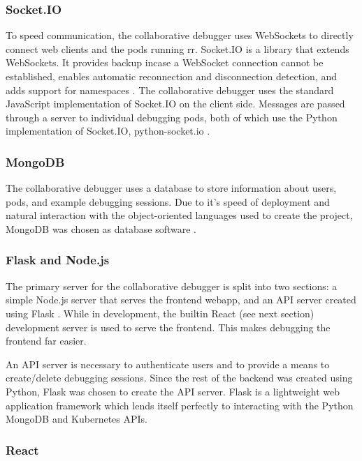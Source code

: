 \documentclass[12pt]{article}
\begin{document}
\subsubsection{Socket.IO}\label{socketio}

To speed communication, the collaborative debugger uses WebSockets to
directly connect web clients and the pods running rr.  Socket.IO is a
library that extends WebSockets.  It provides backup incase a
WebSocket connection cannot be established, enables automatic
reconnection and disconnection detection, and adds support for
namespaces \cite{socketio}.  The collaborative debugger uses the
standard JavaScript implementation of Socket.IO on the client side.
Messages are passed through a server to individual debugging pods,
both of which use the Python implementation of Socket.IO,
python-socket.io \cite{python_socketio}.

\subsubsection{MongoDB}\label{mongodb}

The collaborative debugger uses a database to store information about
users, pods, and example debugging sessions.  Due to it's speed of
deployment and natural interaction with the object-oriented languages
used to create the project, MongoDB was chosen as database software
\cite{mongodb}.

\subsubsection{Flask and Node.js}\label{flask/node}

The primary server for the collaborative debugger is split into two
sections: a simple Node.js \cite{node} server that serves the frontend
webapp, and an API server created using Flask \cite{flask}.  While in
development, the builtin React (see next section) development server
is used to serve the frontend.  This makes debugging the frontend far
easier.
\par

An API server is necessary to authenticate users and to provide a
means to create/delete debugging sessions.  Since the rest of the
backend was created using Python, Flask was chosen to create the API
server.  Flask is a lightweight web application framework which lends
itself perfectly to interacting with the Python MongoDB and Kubernetes
APIs.

\subsubsection{React}\label{react}
\end{document}
